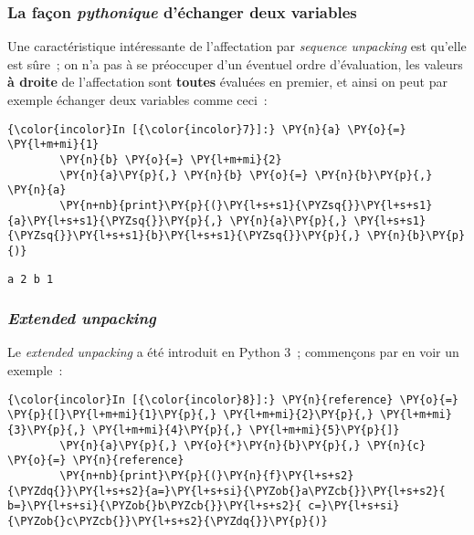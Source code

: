     \hypertarget{la-fauxe7on-pythonique-duxe9changer-deux-variables}{%
\subsubsection{\texorpdfstring{La façon \emph{pythonique} d'échanger
deux
variables}{La façon pythonique d'échanger deux variables}}\label{la-fauxe7on-pythonique-duxe9changer-deux-variables}}

    Une caractéristique intéressante de l'affectation par \emph{sequence
unpacking} est qu'elle est sûre~; on n'a pas à se préoccuper d'un
éventuel ordre d'évaluation, les valeurs \textbf{à droite} de
l'affectation sont \textbf{toutes} évaluées en premier, et ainsi on peut
par exemple échanger deux variables comme ceci~:

    \begin{Verbatim}[commandchars=\\\{\}]
{\color{incolor}In [{\color{incolor}7}]:} \PY{n}{a} \PY{o}{=} \PY{l+m+mi}{1}
        \PY{n}{b} \PY{o}{=} \PY{l+m+mi}{2}
        \PY{n}{a}\PY{p}{,} \PY{n}{b} \PY{o}{=} \PY{n}{b}\PY{p}{,} \PY{n}{a}
        \PY{n+nb}{print}\PY{p}{(}\PY{l+s+s1}{\PYZsq{}}\PY{l+s+s1}{a}\PY{l+s+s1}{\PYZsq{}}\PY{p}{,} \PY{n}{a}\PY{p}{,} \PY{l+s+s1}{\PYZsq{}}\PY{l+s+s1}{b}\PY{l+s+s1}{\PYZsq{}}\PY{p}{,} \PY{n}{b}\PY{p}{)}
\end{Verbatim}


    \begin{Verbatim}[commandchars=\\\{\}]
a 2 b 1

    \end{Verbatim}

    \hypertarget{extended-unpacking}{%
\subsubsection{\texorpdfstring{\emph{Extended
unpacking}}{Extended unpacking}}\label{extended-unpacking}}

    Le \emph{extended unpacking} a été introduit en Python 3~; commençons
par en voir un exemple~:

    \begin{Verbatim}[commandchars=\\\{\}]
{\color{incolor}In [{\color{incolor}8}]:} \PY{n}{reference} \PY{o}{=} \PY{p}{[}\PY{l+m+mi}{1}\PY{p}{,} \PY{l+m+mi}{2}\PY{p}{,} \PY{l+m+mi}{3}\PY{p}{,} \PY{l+m+mi}{4}\PY{p}{,} \PY{l+m+mi}{5}\PY{p}{]}
        \PY{n}{a}\PY{p}{,} \PY{o}{*}\PY{n}{b}\PY{p}{,} \PY{n}{c} \PY{o}{=} \PY{n}{reference}
        \PY{n+nb}{print}\PY{p}{(}\PY{n}{f}\PY{l+s+s2}{\PYZdq{}}\PY{l+s+s2}{a=}\PY{l+s+si}{\PYZob{}a\PYZcb{}}\PY{l+s+s2}{ b=}\PY{l+s+si}{\PYZob{}b\PYZcb{}}\PY{l+s+s2}{ c=}\PY{l+s+si}{\PYZob{}c\PYZcb{}}\PY{l+s+s2}{\PYZdq{}}\PY{p}{)}
\end{Verbatim}


